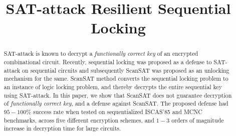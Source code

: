 \documentclass[conference,10pt,letterpaper]{IEEEtran}
\begin{document}
\title{SAT-attack Resilient Sequential Locking}
    

\maketitle
\thispagestyle{empty}

\pagestyle{empty}

\begin{abstract}
SAT-attack is known to decrypt a {\em functionally correct key} of an encrypted combinational circuit. 
Recently, sequential locking was proposed as a defense to SAT-attack on sequential circuits and subsequently ScanSAT was proposed as an unlocking mechanism for the same. 
ScanSAT method converts the sequential locking problem to an instance of logic locking problem, and thereby decrypts the entire sequential key using SAT-attack. 
In this paper, we show that ScanSAT does not guarantee decryption of {\em functionally correct key}, and a defense against ScanSAT.  
The proposed defense had $95-100\%$ success rate when tested on sequentialized ISCAS'85 and MCNC benchmarks, across five different encryption schemes, and $1-3$ orders of magnitude increase in decryption time for large circuits. \\

\end{abstract}





%





\end{document}
